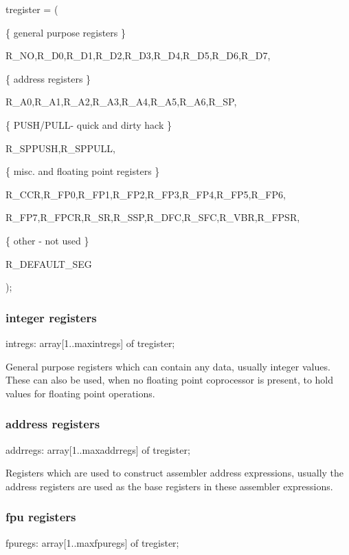 \documentclass [a4paper,12pt]{article}
\begin{document}
\textsf{tregister = (}

\textsf{{\{} general purpose registers {\}} }

\textsf{R{\_}NO,R{\_}D0,R{\_}D1,R{\_}D2,R{\_}D3,R{\_}D4,R{\_}D5,R{\_}D6,R{\_}D7,}

\textsf{{\{} address registers {\}}}

\textsf{R{\_}A0,R{\_}A1,R{\_}A2,R{\_}A3,R{\_}A4,R{\_}A5,R{\_}A6,R{\_}SP,}

\textsf{{\{} PUSH/PULL- quick and dirty hack {\}}}

\textsf{R{\_}SPPUSH,R{\_}SPPULL,}

\textsf{{\{} misc. and floating point registers {\}}}

\textsf{R{\_}CCR,R{\_}FP0,R{\_}FP1,R{\_}FP2,R{\_}FP3,R{\_}FP4,R{\_}FP5,R{\_}FP6,}

\textsf{R{\_}FP7,R{\_}FPCR,R{\_}SR,R{\_}SSP,R{\_}DFC,R{\_}SFC,R{\_}VBR,R{\_}FPSR,}

\textsf{{\{} other - not used {\}}}

\textsf{R{\_}DEFAULT{\_}SEG}

\textsf{);}

\subsubsection{integer registers}
\label{subsubsec:integer}

\textsf{intregs: array[1..maxintregs] of tregister;}

General purpose registers which can contain any data, usually integer
values. These can also be used, when no floating point coprocessor is
present, to hold values for floating point operations.

\subsubsection{address registers}
\label{subsubsec:address}

\textsf{addrregs: array[1..maxaddrregs] of tregister;}

Registers which are used to construct assembler address expressions, usually
the address registers are used as the base registers in these assembler
expressions.

\subsubsection{fpu registers}
\label{subsubsec:mylabel25}

\textsf{fpuregs: array[1..maxfpuregs] of tregister;}
\end{document}
